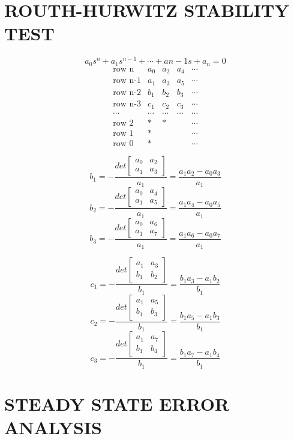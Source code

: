 \begin{multicols}{3}
\section{ROUTH-HURWITZ STABILITY TEST}
\[a_0s^n + a_1s^{n-1}+ \cdots + a{n-1} s + a_n = 0\]
\[ \begin{array}{lllll}
\mbox{row n}   & a_0 & a_2 & a_4 & \cdots \\
\mbox{row n-1} & a_1 & a_3 & a_5 & \cdots \\
\mbox{row n-2} & b_1 & b_2 & b_3 & \cdots \\
\mbox{row n-3} & c_1 & c_2 & c_3 & \cdots \\
\cdots & \cdots & \cdots & \cdots & \cdots \\
\mbox{row 2} & * & * &  & \cdots \\
\mbox{row 1} & * &   &  & \cdots \\
\mbox{row 0} & * &   &  & \cdots \end{array} \]

\[ b_1=-\frac{det\left[\begin{array}{cc}a_0&a_2\\a_1&a_3\end{array}\right]}{a_1}
=\frac{a_1a_2-a_0a_3}{a_1} \]
\[ b_2=-\frac{det\left[\begin{array}{cc}a_0&a_4\\a_1&a_5\end{array}\right]}{a_1}
=\frac{a_1a_4-a_0a_5}{a_1} \]
\[ b_3=-\frac{det\left[\begin{array}{cc}a_0&a_6\\a_1&a_7\end{array}\right]}{a_1}
=\frac{a_1a_6-a_0a_7}{a_1} \]

\[ c_1=-\frac{det\left[\begin{array}{cc}a_1&a_3\\b_1&b_2\end{array}\right]}{b_1}
=\frac{b_1a_3-a_1b_2}{b_1} \]
\[ c_2=-\frac{det\left[\begin{array}{cc}a_1&a_5\\b_1&b_3\end{array}\right]}{b_1}
=\frac{b_1a_5-a_1b_3}{b_1} \]
\[ c_3=-\frac{det\left[\begin{array}{cc}a_1&a_7\\b_1&b_4\end{array}\right]}{b_1}
=\frac{b_1a_7-a_1b_4}{b_1} \]
\section{STEADY STATE ERROR ANALYSIS}


\end{multicols}
